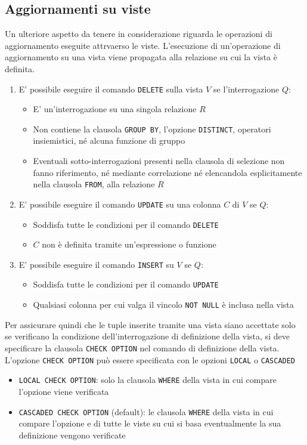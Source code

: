 \documentclass[12pt, a4paper]{report}
\begin{document}
    \subsection{Aggiornamenti su viste}
    Un ulteriore aspetto da tenere in considerazione riguarda le operazioni di aggiornamento eseguite attrvaerso le viste. L'esecuzione di un'operazione di aggiornamento su una vista viene propagata alla relazione su cui la vista è definita.
    \begin{enumerate}
        \item E' possibile eseguire il comando \texttt{DELETE} sulla vista $V$ se l'interrogazione $Q$: \begin{itemize}
            \item E' un'interrogazione su una singola relazione $R$
            \item Non contiene la clausola \texttt{GROUP BY}, l'opzione \texttt{DISTINCT}, operatori insiemistici, né alcuna funzione di gruppo
            \item Eventuali sotto-interrogazioni presenti nella clausola di selezione non fanno riferimento, né mediante correlazione né elencandola esplicitamente nella clausola \texttt{FROM}, alla relazione $R$
        \end{itemize}
        \item E' possibile eseguire il comando \texttt{UPDATE} su una colonna $C$ di $V$ se $Q$: \begin{itemize}
            \item Soddisfa tutte le condizioni per il comando \texttt{DELETE}
            \item $C$ non è definita tramite un'espressione o funzione
        \end{itemize}
        \item E' possibile eseguire il comando \texttt{INSERT} su $V$ se $Q$: \begin{itemize}
            \item Soddisfa tutte le condizioni per il comando \texttt{UPDATE}
            \item Qualsiasi colonna per cui valga il vincolo \texttt{NOT NULL} è inclusa nella vista
        \end{itemize}
    \end{enumerate}
    Per assicurare quindi che le tuple inserite tramite una vista siano accettate solo se verificano la condizione dell'interrogazione di definizione della vista, si deve specificare la clausola \texttt{CHECK OPTION} nel comando di definizione della vista. L'opzione \texttt{CHECK OPTION} può essere specificata con le opzioni \texttt{LOCAL} o \texttt{CASCADED}
    \begin{itemize}
        \item \texttt{LOCAL CHECK OPTION}: solo la clausola \texttt{WHERE} della vista in cui compare l'opzione viene verificata
        \item \texttt{CASCADED CHECK OPTION} (default): le clausola \texttt{WHERE} della vista in cui compare l'opzione e di tutte le viste su cui si basa eventualmente la sua definizione vengono verificate
    \end{itemize}
\end{document}
